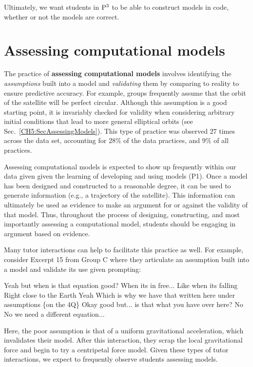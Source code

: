 \documentclass{msuphddissertation}
\begin{document}
\begin{doublespace}
\begin{appendices}
Ultimately, we want students in ${\rm P}^{3}$ to be able to construct models in code, whether or not the models are correct.

\section*{Assessing computational models}

The practice of \textbf{assessing computational models} involves identifying the \textit{assumptions} built into a model and \textit{validating} them by comparing to reality to ensure predictive accuracy.  For example, groups frequently assume that the orbit of the satellite will be perfect circular.  Although this assumption is a good starting point, it is invariably checked for validity when considering arbitrary initial conditions that lead to more general elliptical orbits (see Sec.~\ref{CH5:SecAssessingModels}).  This type of practice was observed $27$ times across the data set, accounting for $28\%$ of the data practices, and $9\%$ of all practices.

Assessing computational models is expected to show up frequently within our data given given the learning of developing and using models (P1).  Once a model has been designed and constructed to a reasonable degree, it can be used to generate information (e.g., a trajectory of the satellite).  This information can ultimately be used as evidence to make an argument for or against the validity of that model.  Thus, throughout the process of designing, constructing, and most importantly assessing a computational model, students should be engaging in argument based on evidence.

Many tutor interactions can help to facilitate this practice as well.  For example, consider Excerpt 15 from Group C where they articulate an assumption built into a model and validate its use given prompting: \begin{description}
\TA Yeah but when is that equation good?
\SB When its in free...
\SC Like when its falling
\TA Right close to the Earth
\SB Yeah
\SC Which is why we have that written here under assumptions \{on the 4Q\}
\TA Okay good but... is that what you have over here?
\SB No
\SC No we need a different equation...
\end{description}  Here, the poor assumption is that of a uniform gravitational acceleration, which invalidates their model.  After this interaction, they scrap the local gravitational force and begin to try a centripetal force model.  Given these types of tutor interactions, we expect to frequently observe students assessing models.


\end{appendices}
\end{doublespace}
\end{document}
